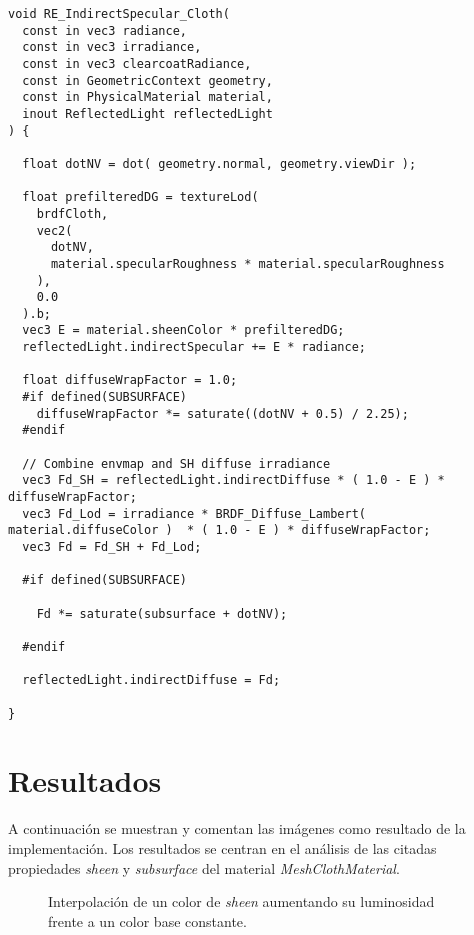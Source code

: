     \begin{lstlisting}
void RE_IndirectSpecular_Cloth(
  const in vec3 radiance,
  const in vec3 irradiance,
  const in vec3 clearcoatRadiance,
  const in GeometricContext geometry,
  const in PhysicalMaterial material,
  inout ReflectedLight reflectedLight
) {

  float dotNV = dot( geometry.normal, geometry.viewDir );

  float prefilteredDG = textureLod(
    brdfCloth,
    vec2(
      dotNV,
      material.specularRoughness * material.specularRoughness
    ),
    0.0
  ).b;
  vec3 E = material.sheenColor * prefilteredDG;
  reflectedLight.indirectSpecular += E * radiance;

  float diffuseWrapFactor = 1.0;
  #if defined(SUBSURFACE)
    diffuseWrapFactor *= saturate((dotNV + 0.5) / 2.25);
  #endif

  // Combine envmap and SH diffuse irradiance
  vec3 Fd_SH = reflectedLight.indirectDiffuse * ( 1.0 - E ) * diffuseWrapFactor;
  vec3 Fd_Lod = irradiance * BRDF_Diffuse_Lambert( material.diffuseColor )  * ( 1.0 - E ) * diffuseWrapFactor;
  vec3 Fd = Fd_SH + Fd_Lod;

  #if defined(SUBSURFACE)

    Fd *= saturate(subsurface + dotNV);

  #endif

  reflectedLight.indirectDiffuse = Fd;

}
    \end{lstlisting}
    \singlespacing

\vspace{1cm}
\section{Resultados}

A continuaci\'on se muestran y comentan las im\'agenes como resultado de la implementaci\'on. Los resultados se centran
en el an\'alisis de las citadas propiedades \textit{sheen} y \textit{subsurface} del material \textit{MeshClothMaterial}.

\begin{figure}[H]
  \vspace{0.5cm}
  \centering
  \caption{Interpolaci\'on de un color de \textit{sheen} aumentando su luminosidad frente a un color base constante.}
\end{figure}

